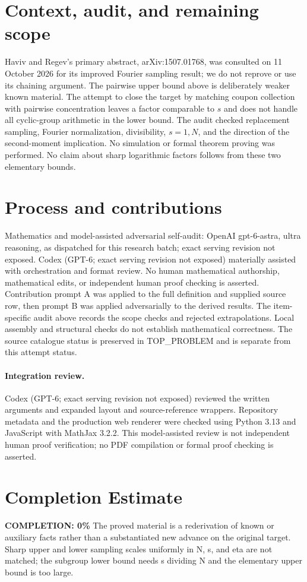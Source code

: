 \documentclass[11pt]{article}
\begin{document}
\section{Context, audit, and remaining scope}
Haviv and Regev's primary abstract, arXiv:1507.01768, was consulted on
11 October 2026 for its improved Fourier sampling result; we do not reprove
or use its chaining argument. The pairwise upper bound above is deliberately
weaker known material. The attempt to close the target by matching coupon
collection with pairwise concentration leaves a factor comparable to $s$
and does not handle all cyclic-group arithmetic in the lower bound.
The audit checked replacement sampling, Fourier normalization, divisibility,
$s=1,N$, and the direction of the second-moment implication. No simulation
or formal theorem proving was performed. No claim about sharp logarithmic
factors follows from these two elementary bounds.

\section{Process and contributions}
Mathematics and model-assisted adversarial self-audit: OpenAI gpt-6-astra, ultra reasoning, as dispatched for this research batch; exact serving revision not exposed. Codex (GPT-6; exact serving revision not exposed) materially assisted with orchestration and format review. No human mathematical authorship, mathematical edits, or independent human proof checking is asserted.
Contribution prompt A was applied to the full definition and supplied source row, then prompt B was applied adversarially to the derived results. The item-specific audit above records the scope checks and rejected extrapolations. Local assembly and structural checks do not establish mathematical correctness. The source catalogue status is preserved in TOP\_PROBLEM and is separate from this attempt status.
\paragraph{Integration review.} Codex (GPT-6; exact serving revision not exposed) reviewed the written arguments and expanded layout and source-reference wrappers. Repository metadata and the production web renderer were checked using Python 3.13 and JavaScript with MathJax 3.2.2. This model-assisted review is not independent human proof verification; no PDF compilation or formal proof checking is asserted.

\section{Completion Estimate}
\noindent\textbf{COMPLETION: 0\%}
The proved material is a rederivation of known or auxiliary facts rather than a substantiated new advance on the original target. Sharp upper and lower sampling scales uniformly in N, s, and eta are not matched; the subgroup lower bound needs s dividing N and the elementary upper bound is too large.
\end{document}
